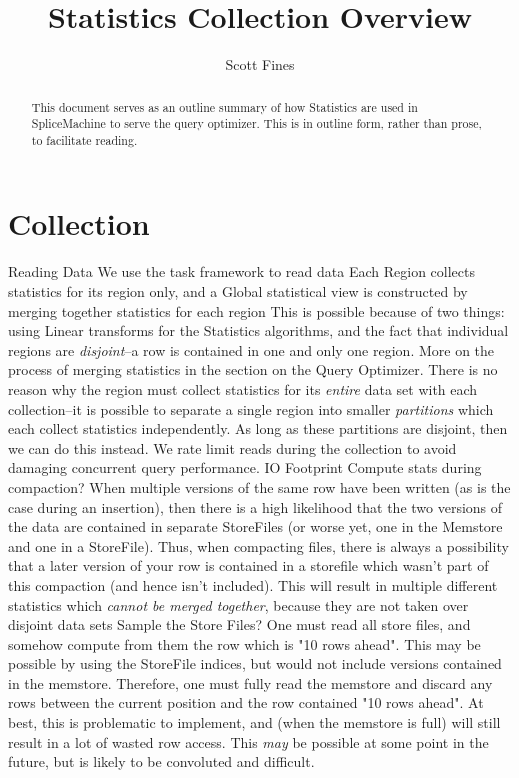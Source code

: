 \documentclass[10pt]{amsart}
\begin{document}
\title{Statistics Collection Overview}
\author{Scott Fines}

\begin{abstract}
This document serves as an outline summary of how Statistics are used in SpliceMachine to serve the query optimizer. This is in outline form, rather than prose, to facilitate reading.
\end{abstract}

\maketitle

\section{Collection}
\begin{outline}[enumerate]
\1 Reading Data
	\2 We use the task framework to read data
		\3 Each Region collects statistics for its region only, and a Global statistical view is constructed by merging together statistics for each region
			\4[*] This is possible because of two things: using Linear transforms for the Statistics algorithms, and the fact that individual regions are \emph{disjoint}--a row is contained in one and only one region. More on the process of merging statistics in the section on the Query Optimizer.
			\4[*] There is no reason why the region must collect statistics for its \emph{entire} data set with each collection--it is possible to separate a single region into smaller \emph{partitions} which each collect statistics independently. As long as these partitions are disjoint, then we can do this instead.
	\2 We rate limit reads during the collection to avoid damaging concurrent query performance.
\1 IO Footprint
	\2 Compute stats during compaction?
		\3[*] When multiple versions of the same row have been written (as is the case during an insertion), then there is a high likelihood that the two versions of the data are contained in separate StoreFiles (or worse yet, one in the Memstore and one in a StoreFile). Thus, when compacting files, there is always a possibility that a later version of your row is contained in a storefile which wasn't part of this compaction (and hence isn't included). This will result in multiple different statistics which \emph{cannot be merged together}, because they are not taken over disjoint data sets
	\2 Sample the Store Files?
		\3[*] One must read all store files, and somehow compute from them the row which is "10 rows ahead". This may be possible by using the StoreFile indices, but would not include versions contained in the memstore. Therefore, one must fully read the memstore and discard any rows between the current position and the row contained "10 rows ahead". At best, this is problematic to implement, and (when the memstore is full) will still result in a lot of wasted row access. This \emph{may} be possible at some point in the future, but is likely to be convoluted and difficult. 

\end{outline}
\end{document}
